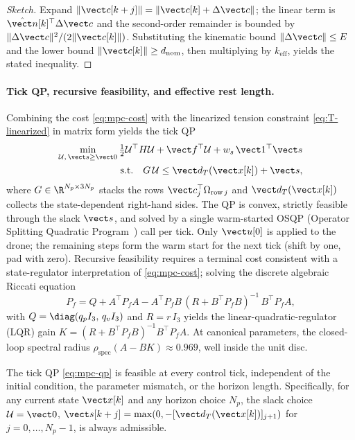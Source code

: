 \begin{proof}[Sketch]
Expand $\|\vect c[k+j]\| = \|\vect c[k] + \Delta\vect c\|$; the linear term is $\hat{\vect n}[k]^\top \Delta\vect c$ and the second-order remainder is bounded by $\|\Delta\vect c\|^2 /
(2\|\vect c[k]\|)$. Substituting the kinematic bound $\|\Delta\vect c\| \le E$ and the lower bound
$\|\vect c[k]\| \ge d_{\mathrm{nom}}$, then multiplying by $k_{\mathrm{eff}}$, yields the stated inequality.
\end{proof}

\paragraph{Tick QP, recursive feasibility, and effective rest length.} Combining the cost \eqref{eq:mpc-cost} with the linearized tension constraint \eqref{eq:T-linearized} in matrix
form yields the tick QP
\begin{align}
\label{eq:mpc-qp}
  \min_{\mathcal{U},\,\vect s \ge \vect 0}
    \tfrac{1}{2}\mathcal{U}^\top H \mathcal{U}
    + \vect f^\top \mathcal{U}
    + w_s\,\vect 1^\top \vect s\\
  \text{s.t.}
  \quad
  G\,\mathcal{U} \le \vect d_T(\vect x[k]) + \vect s,\nonumber
\end{align}
where $G \in \R^{N_p \times 3N_p}$ stacks the rows $\vect c_j^\top \Omega_{\mathrm{row}\,j}$ and
$\vect d_T(\vect x[k])$ collects the state-dependent right-hand sides. The QP is convex, strictly feasible through the slack $\vect s$, and solved by a single warm-started OSQP (Operator Splitting Quadratic Program~\cite{stellato2020osqp}) call per tick. Only $\vect u[0]$ is applied to the drone; the remaining steps form the warm start for the next tick (shift by one, pad with zero). Recursive feasibility requires a terminal cost consistent with a state-regulator interpretation of \eqref{eq:mpc-cost}; solving the discrete algebraic Riccati
equation
\begin{equation}
  P_f = Q + A^\top P_f A
        - A^\top P_f B\,(R + B^\top P_f B)^{-1}\,B^\top P_f A,
  \label{eq:DARE}
\end{equation}
with $Q = \diag(q_p I_3,\, q_v I_3)$ and $R = r\,I_3$ yields the linear-quadratic-regulator (LQR) gain $K = (R + B^\top P_f B)^{-1} B^\top P_f A$. At canonical parameters, the closed-loop spectral radius $\rho_{\mathrm{spec}}(A - BK) \approx 0.969$, well inside the unit disc.

\begin{corollary}
\label{cor:mpc-recfeas}
The tick QP \eqref{eq:mpc-qp} is feasible at every control tick, independent of the initial condition, the parameter mismatch, or the horizon length. Specifically, for any current state $\vect x[k]$ and any horizon choice $N_p$, the slack choice $\mathcal{U} = \vect 0$, $\vect s[k+j] = \max(0, -[\vect d_T(\vect x[k])]_{j+1})$ for $j = 0, \dots, N_p - 1$, is always admissible.
\end{corollary}

